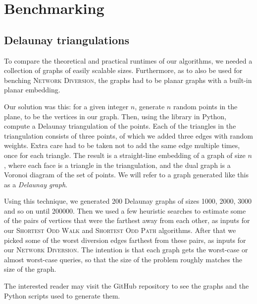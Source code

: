 \section{Benchmarking}


\subsection{Delaunay triangulations}
\label{subsection:delaunay}
To compare the theoretical and practical runtimes of our algorithms, we needed a collection of graphs of easily scalable sizes. Furthermore, as to also be used for benching \textsc{Network Diversion}, the graphs had to be planar graphs with a built-in planar embedding.

Our solution was this: for a given integer $n$, generate $n$ random points in the plane, to be the vertices in our graph. Then, using the  library in Python, compute a Delaunay triangulation of the points. Each of the triangles in the triangulation consists of three points, of which we added three edges with random weights. Extra care had to be taken not to add the same edge multiple times, once for each triangle. The result is a straight-line embedding of a graph of size $n$, where each face is a triangle in the triangulation, and the dual graph is a Voronoi diagram of the set of points. We will refer to a graph generated like this as a \emph{Delaunay graph}.

Using this technique, we generated 200 Delaunay graphs of sizes 1000, 2000, 3000 and so on until 200000. Then we used a few heuristic searches to estimate some of the pairs of vertices that were the farthest away from each other, as inputs for our \textsc{Shortest Odd Walk} and \textsc{Shortest Odd Path} algorithms. After that we picked some of the worst diversion edges farthest from these pairs, as inputs for our \textsc{Network Diversion}. The intention is that each graph gets the worst-case or almost worst-case queries, so that the size of the problem roughly matches the size of the graph.

The interested reader may visit the GitHub repository \cite{source:codebase} to see the graphs and the Python scripts used to generate them.

